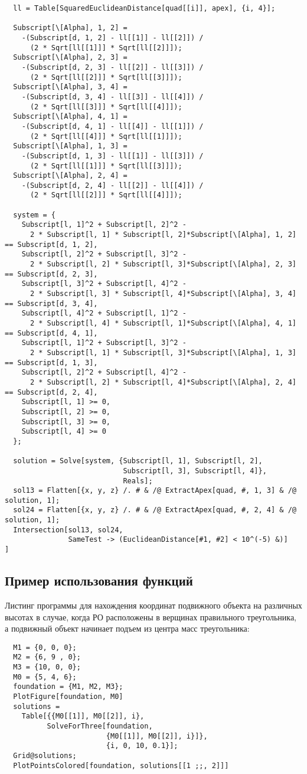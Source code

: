 \documentclass[../main.tex]{subfiles}
\begin{document}
\begin{lstlisting}
  ll = Table[SquaredEuclideanDistance[quad[[i]], apex], {i, 4}];

  Subscript[\[Alpha], 1, 2] =
    -(Subscript[d, 1, 2] - ll[[1]] - ll[[2]]) /
      (2 * Sqrt[ll[[1]]] * Sqrt[ll[[2]]]);
  Subscript[\[Alpha], 2, 3] =
    -(Subscript[d, 2, 3] - ll[[2]] - ll[[3]]) /
      (2 * Sqrt[ll[[2]]] * Sqrt[ll[[3]]]);
  Subscript[\[Alpha], 3, 4] =
    -(Subscript[d, 3, 4] - ll[[3]] - ll[[4]]) /
      (2 * Sqrt[ll[[3]]] * Sqrt[ll[[4]]]);
  Subscript[\[Alpha], 4, 1] =
    -(Subscript[d, 4, 1] - ll[[4]] - ll[[1]]) /
      (2 * Sqrt[ll[[4]]] * Sqrt[ll[[1]]]);
  Subscript[\[Alpha], 1, 3] =
    -(Subscript[d, 1, 3] - ll[[1]] - ll[[3]]) /
      (2 * Sqrt[ll[[1]]] * Sqrt[ll[[3]]]);
  Subscript[\[Alpha], 2, 4] =
    -(Subscript[d, 2, 4] - ll[[2]] - ll[[4]]) /
      (2 * Sqrt[ll[[2]]] * Sqrt[ll[[4]]]);

  system = {
    Subscript[l, 1]^2 + Subscript[l, 2]^2 -
      2 * Subscript[l, 1] * Subscript[l, 2]*Subscript[\[Alpha], 1, 2] == Subscript[d, 1, 2],
    Subscript[l, 2]^2 + Subscript[l, 3]^2 -
      2 * Subscript[l, 2] * Subscript[l, 3]*Subscript[\[Alpha], 2, 3] == Subscript[d, 2, 3],
    Subscript[l, 3]^2 + Subscript[l, 4]^2 -
      2 * Subscript[l, 3] * Subscript[l, 4]*Subscript[\[Alpha], 3, 4] == Subscript[d, 3, 4],
    Subscript[l, 4]^2 + Subscript[l, 1]^2 -
      2 * Subscript[l, 4] * Subscript[l, 1]*Subscript[\[Alpha], 4, 1] == Subscript[d, 4, 1],
    Subscript[l, 1]^2 + Subscript[l, 3]^2 -
      2 * Subscript[l, 1] * Subscript[l, 3]*Subscript[\[Alpha], 1, 3] == Subscript[d, 1, 3],
    Subscript[l, 2]^2 + Subscript[l, 4]^2 -
      2 * Subscript[l, 2] * Subscript[l, 4]*Subscript[\[Alpha], 2, 4] == Subscript[d, 2, 4],
    Subscript[l, 1] >= 0,
    Subscript[l, 2] >= 0,
    Subscript[l, 3] >= 0,
    Subscript[l, 4] >= 0
  };

  solution = Solve[system, {Subscript[l, 1], Subscript[l, 2],
                            Subscript[l, 3], Subscript[l, 4]},
                            Reals];
  sol13 = Flatten[{x, y, z} /. # & /@ ExtractApex[quad, #, 1, 3] & /@ solution, 1];
  sol24 = Flatten[{x, y, z} /. # & /@ ExtractApex[quad, #, 2, 4] & /@ solution, 1];
  Intersection[sol13, sol24,
               SameTest -> (EuclideanDistance[#1, #2] < 10^(-5) &)]
]
\end{lstlisting}

\subsection{Пример использования функций}
Листинг программы для нахождения координат подвижного объекта на различных высотах в случае, когда РО расположены в верщинах правильного треугольника, а подвижный объект начинает подъем из центра масс треугольника:
\begin{lstlisting}
  M1 = {0, 0, 0};
  M2 = {6, 9 , 0};
  M3 = {10, 0, 0};
  M0 = {5, 4, 6};
  foundation = {M1, M2, M3};
  PlotFigure[foundation, M0]
  solutions =
    Table[{{M0[[1]], M0[[2]], i},
          SolveForThree[foundation,
                        {M0[[1]], M0[[2]], i}]},
                        {i, 0, 10, 0.1}];
  Grid@solutions;
  PlotPointsColored[foundation, solutions[[1 ;;, 2]]]
\end{lstlisting}
\end{document}

